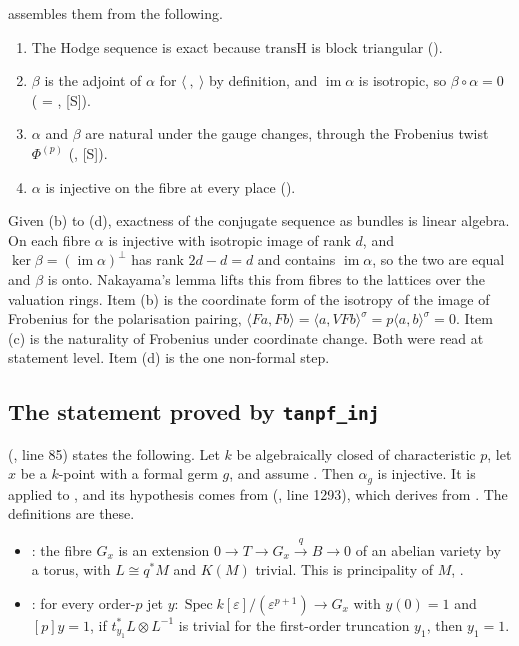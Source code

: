 \documentclass[11pt]{article}
\newcommand{\mS}{\textsf{[S]}}
\theoremstyle{remark}
\begin{document}
 assembles them from the following.
\begin{enumerate}[nosep]
\item[(a)] The Hodge sequence is exact because $\mathrm{transH}$ is block triangular ().
\item[(b)] $\beta$ is the adjoint of $\alpha$ for $\langle\ ,\ \rangle$ by definition, and $\operatorname{im}\alpha$ is isotropic, so $\beta\circ\alpha=0$ ( = , \mS).
\item[(c)] $\alpha$ and $\beta$ are natural under the gauge changes, through the Frobenius twist $\Phi^{(p)}$ (, \mS).
\item[(d)] $\alpha$ is injective on the fibre at every place ().
\end{enumerate}
Given (b) to (d), exactness of the conjugate sequence as bundles is linear algebra. On each fibre $\alpha$ is injective with isotropic image of rank $d$, and $\ker\beta=(\operatorname{im}\alpha)^\perp$ has rank $2d-d=d$ and contains $\operatorname{im}\alpha$, so the two are equal and $\beta$ is onto. Nakayama's lemma lifts this from fibres to the lattices over the valuation rings. Item (b) is the coordinate form of the isotropy of the image of Frobenius for the polarisation pairing, $\langle Fa,Fb\rangle=\langle a,VFb\rangle^{\sigma}=p\langle a,b\rangle^{\sigma}=0$. Item (c) is the naturality of Frobenius under coordinate change. Both were read at statement level. Item (d) is the one non-formal step.

\subsection{The statement proved by \texttt{tanpf\_inj}}

 (, line 85) states the following. Let $k$ be algebraically closed of characteristic $p$, let $x$ be a $k$-point with a formal germ $g$, and assume . Then $\alpha_g$ is injective. It is  applied to , and its hypothesis comes from  (, line 1293), which derives  from . The definitions are these.
\begin{itemize}[nosep]
\item {}: the fibre $G_x$ is an extension $0\to T\to G_x\xrightarrow{q}B\to0$ of an abelian variety by a torus, with $L\cong q^*M$ and $K(M)$ trivial. This is principality of $M$, .
\item {}: for every order-$p$ jet $y:\operatorname{Spec}k[\varepsilon]/(\varepsilon^{p+1})\to G_x$ with $y(0)=1$ and $[p]y=1$, if $t_{y_1}^*L\otimes L^{-1}$ is trivial for the first-order truncation $y_1$, then $y_1=1$.
\end{itemize}
\end{document}
